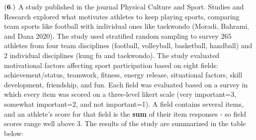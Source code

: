 \documentclass[
]{article}
\begin{document}
\(\bf (6.)\) A study published in the journal Physical Culture and
Sport. Studies and Research explored what motivates athletes to keep
playing sports, comparing team sports like football with individual ones
like taekwondo (Moradi, Bahrami, and Dana 2020). The study used
stratified random sampling to survey \(265\) athletes from four team
disciplines (football, volleyball, basketball, handball) and 2
individual disciplines (kung fu and taekwondo). The study evaluated
motivational factors affecting sport participation based on eight
fields: achievement/status, teamwork, fitness, energy release,
situational factors, skill development, friendship, and fun. Each field
was evaluated based on a survey in which every item was scored on a
three-level likert scale (very important=3, somewhat important=2, and
not important=1). A field contains several items, and an athlete's score
for that field is the \textbf{sum} of their item responses - so field
scores range well above 3. The results of the study are summarized in
the table below:
\end{document}
